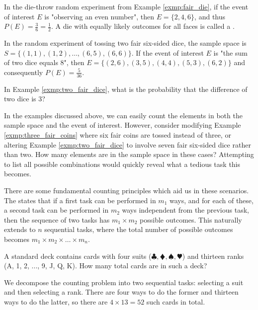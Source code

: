 \begin{exmp}\label{exmp:fair_die_even}
	In the die-throw random experiment from Example \autoref{exmp:fair_die}, if the event of interest \( E \) is "observing an even number",
	then \( E = \{ 2, 4, 6 \} \), and thus \( P(E) = \frac{3}{6} = \frac{1}{2} \).
	A die with equally likely outcomes for all faces is called a .
\end{exmp}

\begin{exmp}\label{exmp:two_fair_dice}
	In the random experiment of tossing two fair six-sided dice, the sample space is
	\( S = \{ (1, 1), (1, 2), \ldots, (6, 5), (6, 6) \} \).
	If the event of interest \( E \) is "the sum of two dice equals 8",
	then \( E = \{ (2, 6), (3, 5), (4, 4), (5, 3), (6, 2) \} \) and consequently \( P(E) = \frac{5}{36} \).
\end{exmp}

\begin{ex}
	In Example \autoref{exmp:two_fair_dice}, what is the probability that the difference of two dice is 3?
\end{ex}

In the examples discussed above, we can easily count the elements in both the sample space and the event of interest.
However, consider modifying Example \autoref{exmp:three_fair_coins} where six fair coins are tossed instead of three,
or altering Example \autoref{exmp:two_fair_dice} to involve seven fair six-sided dice rather than two.
How many elements are in the sample space in these cases?
Attempting to list all possible combinations would quickly reveal what a tedious task this becomes.

There are some fundamental counting principles which aid us in these scenarios.
The  states that if a first task can be performed in \( m_1 \) ways,
and for each of these, a second task can be performed in \( m_2 \) ways independent from the previous task,
then the sequence of two tasks has \( m_1 \times m_2 \) possible outcomes.
This naturally extends to \( n \) sequential tasks,
where the total number of possible outcomes becomes \( m_1 \times m_2 \times \ldots \times m_n \).

\begin{exmp}
	A standard deck contains cards with four suits (\( \clubsuit, \vardiamondsuit, \spadesuit, \varheartsuit \)) and thirteen ranks (A, 1, 2, ..., 9, J, Q, K).
	How many total cards are in such a deck?
\end{exmp}
\begin{solution}
	We decompose the counting problem into two sequential tasks:
	selecting a suit and then selecting a rank.
	There are four ways to do the former and thirteen ways to do the latter, so there are \( 4 \times 13 = 52 \) such cards in total.
\end{solution}

